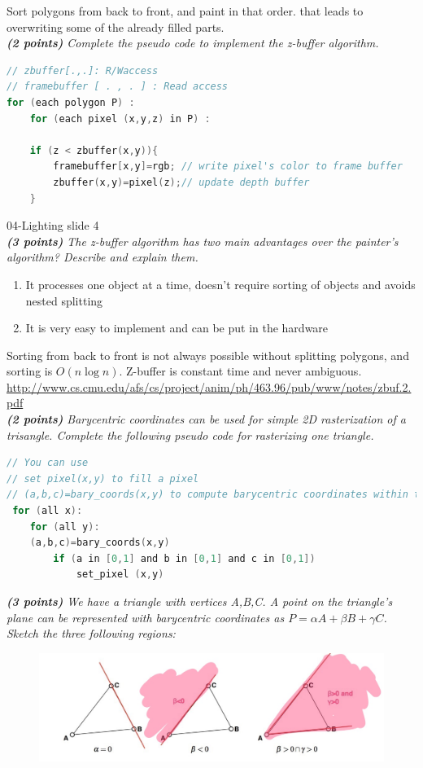 \documentclass[a4paper,10pt]{article}
\begin{document}
Sort polygons from back to front, and paint in that order. that leads to overwriting some of the already
filled parts.\\

\textit{\textbf{(2 points)} Complete the pseudo code to implement the z-buffer algorithm.}\\

\begin{lstlisting}[language=C]
// zbuffer[.,.]: R/Waccess
// framebuffer [ . , . ] : Read access
for (each polygon P) :
	for (each pixel (x,y,z) in P) :

	if (z < zbuffer(x,y)){
		framebuffer[x,y]=rgb; // write pixel's color to frame buffer
		zbuffer(x,y)=pixel(z);// update depth buffer
	}
\end{lstlisting}
04-Lighting slide 4\\

\textit{\textbf{(3 points)} The z-buffer algorithm has two main advantages over the painter’s algorithm? Describe and explain them.}
\begin{enumerate}
	\item It processes one object at a time, doesn’t require sorting of objects and avoids nested splitting
	\item It is very easy to implement and can be put in the hardware
\end{enumerate}

Sorting from back to front is not always possible without splitting polygons, and sorting is  $O(n \log n)$. Z-buffer is constant time and never ambiguous.\\

\url{http://www.cs.cmu.edu/afs/cs/project/anim/ph/463.96/pub/www/notes/zbuf.2.pdf}\\

\textit{\textbf{(2 points)} Barycentric coordinates can be used for simple 2D rasterization of a trisangle. Complete the following pseudo code for rasterizing one triangle.}\\
\begin{lstlisting}[language=C]
// You can use
// set pixel(x,y) to fill a pixel
// (a,b,c)=bary_coords(x,y) to compute barycentric coordinates within the triangle
 for (all x): 
 	for (all y):
 	(a,b,c)=bary_coords(x,y)
		if (a in [0,1] and b in [0,1] and c in [0,1])
			set_pixel (x,y)
\end{lstlisting}

\textit{\textbf{(3 points)} We have a triangle with vertices A,B,C. A point on the triangle’s plane can be represented with barycentric coordinates as $P = \alpha A + \beta B + \gamma C$. Sketch the three following regions:}
\begin{figure}[H]
	\centering
	\includegraphics[width=.7\textwidth]{3-textures}
\end{figure}
\end{document}
